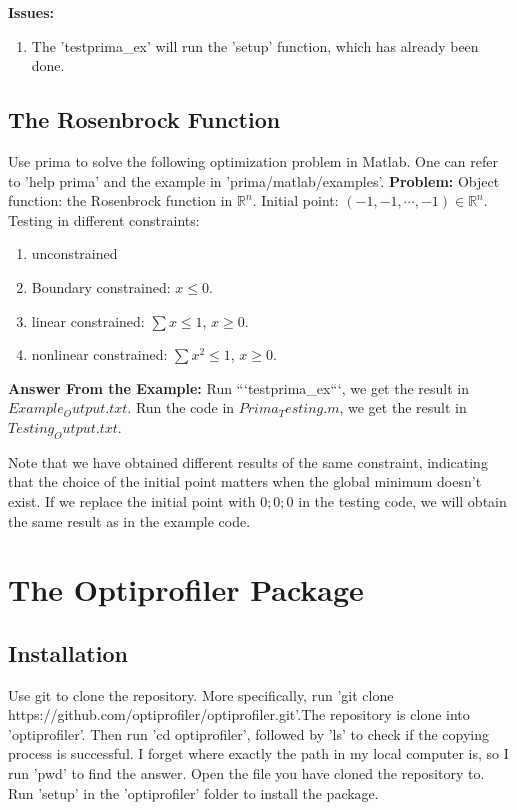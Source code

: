 \documentclass[12pt,a4paper,draft]{article}  %
\theoremstyle{definition}
\numberwithin{equation}{section}
\begin{document}
\textbf{Issues:}
\begin{enumerate}
    \item The 'testprima_ex' will run the 'setup' function, which has already been done.
\end{enumerate}

\subsection{The Rosenbrock Function}
    Use prima to solve the following optimization problem in Matlab. One can refer to 'help prima' and the example in 'prima/matlab/examples'.
\textbf{Problem:}
    Object function: the Rosenbrock function in \(\mathbb{R}^{n}\).
    Initial point: \((-1, -1, \cdots, -1) \in \mathbb{R}^{n} \).
    Testing in different constraints:
\begin{enumerate}
    \item unconstrained
    \item Boundary constrained: \(x \leq 0\).
    \item linear constrained: \(\sum x \leq 1\), \(x \geq 0\).
    \item nonlinear constrained: \(\sum x^{2} \leq 1\), \(x \geq 0\).
\end{enumerate}

    \textbf{Answer From the Example:}
    Run ```testprima_ex```, we get the result in \(Example_Output.txt\).
    Run the code in \(Prima_Testing.m\), we get the result in \(Testing_Output.txt\).  

    Note that we have obtained different results of the same constraint, indicating that the choice of the initial point matters when the global minimum doesn't exist. If we replace the initial point with \(0; 0; 0\) in the testing code, we will obtain the same result as in the example code.

\section{The Optiprofiler Package}

\subsection{Installation}
    Use git to clone the repository. More specifically, run 'git clone https://github.com/optiprofiler/optiprofiler.git'.The repository is clone into 'optiprofiler'.
    Then run 'cd optiprofiler', followed by 'ls' to check if the copying process is successful.
    I forget where exactly the path in my local computer is, so I run 'pwd' to find the answer.
    Open the file you have cloned the repository to.
    Run 'setup' in the 'optiprofiler' folder to install the package.
\end{document}
